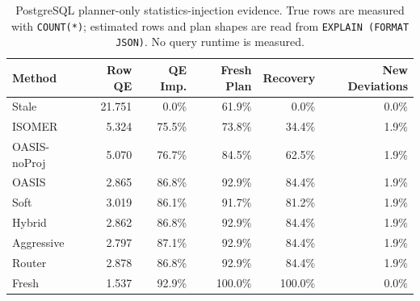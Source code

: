 \begin{table}[t]
  \centering
  \small
  \caption{PostgreSQL planner-only statistics-injection evidence. True rows are measured with \texttt{COUNT(*)}; estimated rows and plan shapes are read from \texttt{EXPLAIN (FORMAT JSON)}. No query runtime is measured.}
  \label{tab:postgres_planner_stats_injection}
  \setlength{\tabcolsep}{4pt}
  \begin{tabular}{lrrrrr}
    \toprule
    Method & Row QE & QE Imp. & Fresh Plan & Recovery & New Deviations \\
    \midrule
    Stale & 21.751 & 0.0\% & 61.9\% & 0.0\% & 0.0\% \\
    ISOMER & 5.324 & 75.5\% & 73.8\% & 34.4\% & 1.9\% \\
    OASIS-noProj & 5.070 & 76.7\% & 84.5\% & 62.5\% & 1.9\% \\
    OASIS & 2.865 & 86.8\% & 92.9\% & 84.4\% & 1.9\% \\
    Soft & 3.019 & 86.1\% & 91.7\% & 81.2\% & 1.9\% \\
    Hybrid & 2.862 & 86.8\% & 92.9\% & 84.4\% & 1.9\% \\
    Aggressive & 2.797 & 87.1\% & 92.9\% & 84.4\% & 1.9\% \\
    Router & 2.878 & 86.8\% & 92.9\% & 84.4\% & 1.9\% \\
    Fresh & 1.537 & 92.9\% & 100.0\% & 100.0\% & 0.0\% \\
    \bottomrule
  \end{tabular}
\end{table}

